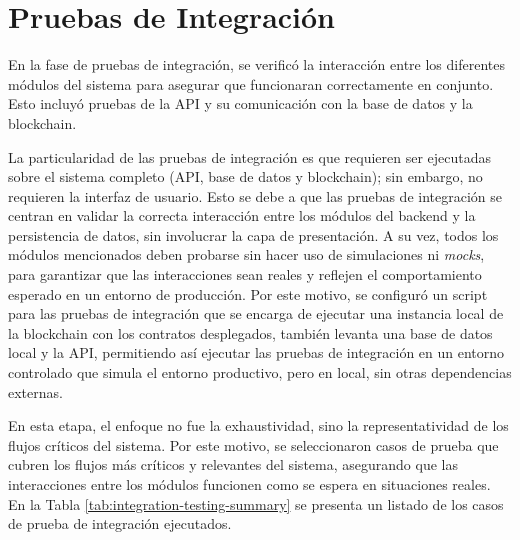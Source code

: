 \section{Pruebas de Integración}
\label{sec:integration-testing-details}

En la fase de pruebas de integración, se verificó la interacción entre los diferentes módulos del sistema para asegurar que funcionaran correctamente en conjunto. Esto incluyó pruebas de la API y su comunicación con la base de datos y la blockchain. 

La particularidad de las pruebas de integración es que requieren ser ejecutadas sobre el sistema completo (API, base de datos y blockchain); sin embargo, no requieren la interfaz de usuario. Esto se debe a que las pruebas de integración se centran en validar la correcta interacción entre los módulos del backend y la persistencia de datos, sin involucrar la capa de presentación. A su vez, todos los módulos mencionados deben probarse sin hacer uso de simulaciones ni \textit{mocks}, para garantizar que las interacciones sean reales y reflejen el comportamiento esperado en un entorno de producción. Por este motivo, se configuró un script para las pruebas de integración que se encarga de ejecutar una instancia local de la blockchain con los contratos desplegados, también levanta una base de datos local y la API, permitiendo así ejecutar las pruebas de integración en un entorno controlado que simula el entorno productivo, pero en local, sin otras dependencias externas. 

En esta etapa, el enfoque no fue la exhaustividad, sino la representatividad de los flujos críticos del sistema. Por este motivo, se seleccionaron casos de prueba que cubren los flujos más críticos y relevantes del sistema, asegurando que las interacciones entre los módulos funcionen como se espera en situaciones reales. En la Tabla \ref{tab:integration-testing-summary} se presenta un listado de los casos de prueba de integración ejecutados.

